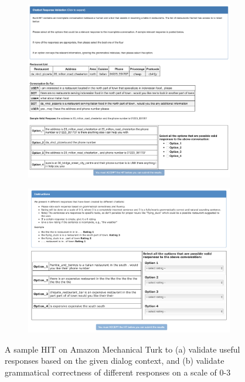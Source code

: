 \begin{figure}
\centering
\begin{subfigure}{0.8\textwidth}
 \includegraphics[width=\linewidth]{assets/AMT_screen.png}
 \caption{}\label{fig:testa}
\end{subfigure}


\begin{subfigure}{0.8\textwidth}
 \includegraphics[width=\linewidth]{assets/AMT_screen_grammar.png}
 \caption{}\label{fig:testb}
\end{subfigure}
\caption{A sample HIT on Amazon Mechanical Turk to (a) validate useful responses based on the given dialog context, and (b) validate grammatical correctness of different responses on a scale of 0-3}
\end{figure}

